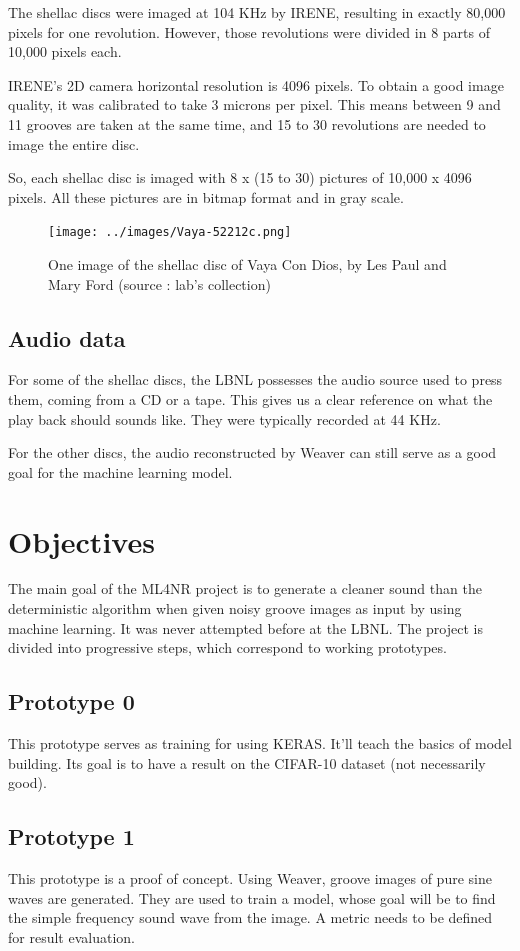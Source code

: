 \documentclass[12pt, twoside]{article}
\begin{document}
The shellac discs were imaged at 104 KHz by IRENE, resulting in exactly 80,000 pixels for one revolution. However, those revolutions were divided in 8 parts of 10,000 pixels each. 

IRENE's 2D camera horizontal resolution is 4096 pixels. To obtain a good image quality, it was calibrated to take 3 microns per pixel. This means between 9 and 11 grooves are taken at the same time, and 15 to 30 revolutions are needed to image the entire disc.

So, each shellac disc is imaged with 8 x (15 to 30) pictures of 10,000 x 4096 pixels. All these pictures are in bitmap format and in gray scale.

\begin{figure}[H]
	\centering
	\texttt{[image: ../images/Vaya-52212c.png]}
	\caption{One image of the shellac disc of Vaya Con Dios, by Les Paul and Mary Ford (source : lab's collection)}
	\label{vaya}
\end{figure}
\subsection{Audio data}
For some of the shellac discs, the LBNL possesses the audio source used to press them, coming from a CD or a tape. This gives us a clear reference on what the play back should sounds like. They were typically recorded at 44 KHz.

For the other discs, the audio reconstructed by Weaver can still serve as a good goal for the machine learning model. 

\section{Objectives}
The main goal of the ML4NR project is to generate a cleaner sound than the deterministic algorithm when given noisy groove images as input by using machine learning. It was never attempted before at the LBNL. The project is divided into progressive steps, which correspond to working prototypes.
\subsection{Prototype 0}
This prototype serves as training for using KERAS. It'll teach the basics of model building. Its goal is to have a result on the CIFAR-10 dataset (not necessarily good). 
\subsection{Prototype 1}
This prototype is a proof of concept. Using Weaver, groove images of pure sine waves are generated. They are used to train a model, whose goal will be to find the simple frequency sound wave from the image. A metric needs to be defined for result evaluation.
\end{document}
